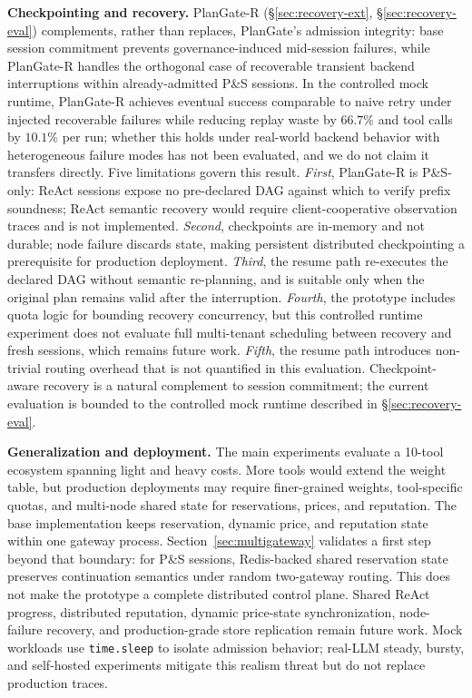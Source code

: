 \documentclass[sigconf,review,anonymous]{acmart}
\begin{document}
\textbf{Checkpointing and recovery.}
PlanGate-R (\S\ref{sec:recovery-ext}, \S\ref{sec:recovery-eval}) complements, rather than replaces, PlanGate's admission integrity: base session commitment prevents governance-induced mid-session failures, while PlanGate-R handles the orthogonal case of recoverable transient backend interruptions within already-admitted P\&S sessions.
In the controlled mock runtime, PlanGate-R achieves eventual success comparable to naive retry under injected recoverable failures while reducing replay waste by $66.7\%$ and tool calls by $10.1\%$ per run; whether this holds under real-world backend behavior with heterogeneous failure modes has not been evaluated, and we do not claim it transfers directly.
Five limitations govern this result.
\emph{First}, PlanGate-R is P\&S-only: ReAct sessions expose no pre-declared DAG against which to verify prefix soundness; ReAct semantic recovery would require client-cooperative observation traces and is not implemented.
\emph{Second}, checkpoints are in-memory and not durable; node failure discards state, making persistent distributed checkpointing a prerequisite for production deployment.
\emph{Third}, the resume path re-executes the declared DAG without semantic re-planning, and is suitable only when the original plan remains valid after the interruption.
\emph{Fourth}, the prototype includes quota logic for bounding recovery concurrency, but this controlled runtime experiment does not evaluate full multi-tenant scheduling between recovery and fresh sessions, which remains future work.
\emph{Fifth}, the resume path introduces non-trivial routing overhead that is not quantified in this evaluation.
Checkpoint-aware recovery is a natural complement to session commitment; the current evaluation is bounded to the controlled mock runtime described in \S\ref{sec:recovery-eval}.

\textbf{Generalization and deployment.}
The main experiments evaluate a 10-tool ecosystem spanning light and heavy costs. More tools would extend the weight table, but production deployments may require finer-grained weights, tool-specific quotas, and multi-node shared state for reservations, prices, and reputation. The base implementation keeps reservation, dynamic price, and reputation state within one gateway process. Section~\ref{sec:multigateway} validates a first step beyond that boundary: for P\&S sessions, Redis-backed shared reservation state preserves continuation semantics under random two-gateway routing. This does not make the prototype a complete distributed control plane. Shared ReAct progress, distributed reputation, dynamic price-state synchronization, node-failure recovery, and production-grade store replication remain future work. Mock workloads use \texttt{time.sleep} to isolate admission behavior; real-LLM steady, bursty, and self-hosted experiments mitigate this realism threat but do not replace production traces.
\end{document}
